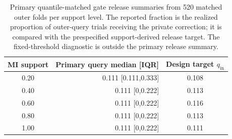 \begin{table}[!t]
\caption{Primary quantile-matched gate release summaries from 520 matched outer folds per support level. The reported fraction is the realized proportion of outer-query trials receiving the private correction; it is compared with the prespecified support-derived release target. The fixed-threshold diagnostic is outside the primary release summary.}
\label{tab:gate_distribution}
\centering
\scriptsize
\begin{tabular}{c r c}
\toprule
MI support & Primary query median [IQR] & Design target $q_{\mathrm{in}}$ \\
\midrule
0.20 & 0.111 [0.111,0.333] & 0.108 \\
0.40 & 0.111 [0,0.222] & 0.113 \\
0.60 & 0.111 [0,0.222] & 0.116 \\
0.80 & 0.111 [0,0.222] & 0.113 \\
1.00 & 0.111 [0,0.222] & 0.111 \\
\bottomrule
\end{tabular}
\end{table}
